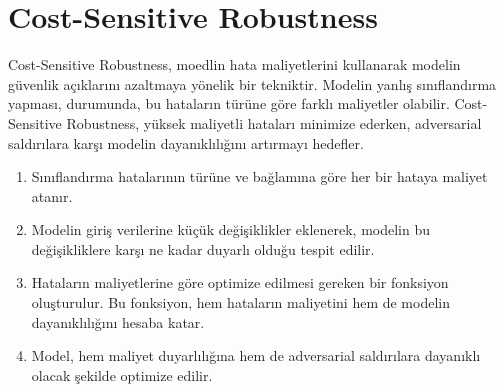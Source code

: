 \section{Cost-Sensitive Robustness}

Cost-Sensitive Robustness, moedlin hata maliyetlerini kullanarak modelin güvenlik açıklarını azaltmaya yönelik bir tekniktir. Modelin yanlış sınıflandırma yapması, durumunda, bu hataların türüne göre farklı maliyetler olabilir. Cost-Sensitive Robustness, yüksek maliyetli hataları minimize ederken, adversarial saldırılara karşı modelin dayanıklılığını artırmayı hedefler. 

\begin{enumerate}
    \item Sınıflandırma hatalarının türüne ve bağlamına göre her bir hataya maliyet atanır.
    \item Modelin giriş verilerine küçük değişiklikler eklenerek, modelin bu değişikliklere karşı ne kadar duyarlı olduğu tespit edilir.
    \item Hataların maliyetlerine göre optimize edilmesi gereken bir fonksiyon oluşturulur. Bu fonksiyon, hem hataların maliyetini hem de modelin dayanıklılığını hesaba katar.
    \item Model, hem maliyet duyarlılığına hem de adversarial saldırılara dayanıklı olacak şekilde optimize edilir.
\end{enumerate}

\newpage